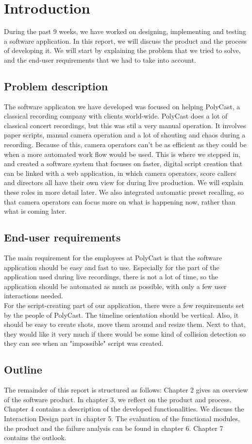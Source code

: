 \section{Introduction}

During the past 9 weeks, we have worked on designing, implementing and testing a software application. In this report, we will discuss the product and the process of developing it. We will start by explaining the problem that we tried to solve, and the end-user requirements that we had to take into account.

\subsection{Problem description}
The software applicaton we have developed was focused on helping PolyCast, a classical recording company with clients world-wide. PolyCast does a lot of classical concert recordings, but this was stil a very manual operation. It involves paper scripts, manual camera operation and a lot of shouting and chaos during a recording. Because of this, camera operators can't be as efficient as they could be when a more automated work flow would be used. This is where we stepped in, and created a software system that focuses on faster, digital script creation that can be linked with a web application, in which camera operators, score callers and directors all have their own view for during live production. We will explain these roles in more detail later. We also integrated automatic preset recalling, so that camera operators can focus more on what is happening now, rather than what is coming later.

\subsection{End-user requirements}
The main requirement for the employees at PolyCast is that the software application should be easy and fast to use. Especially for the part of the application used during live recordings, there is not a lot of time, so the application should be automated as much as possible, with only a few user interactions needed.\\
For the script-creating part of our application, there were a few requirements set by the people of PolyCast. The timeline orientation should be vertical. Also, it should be easy to create shots, move them around and resize them. Next to that, they would like it very much if there would be some kind of collision detection so they can see when an "impossible" script was created.

\subsection{Outline}
The remainder of this report is structured as follows: Chapter 2 gives an overview of the software product. In chapter 3, we reflect on the product and process. Chapter 4 contains a description of the developed functionalities. We discuss the Interaction Design part in chapter 5. The evaluation of the functional modules, the product and the failure analysis can be found in chapter 6. Chapter 7 contains the outlook.